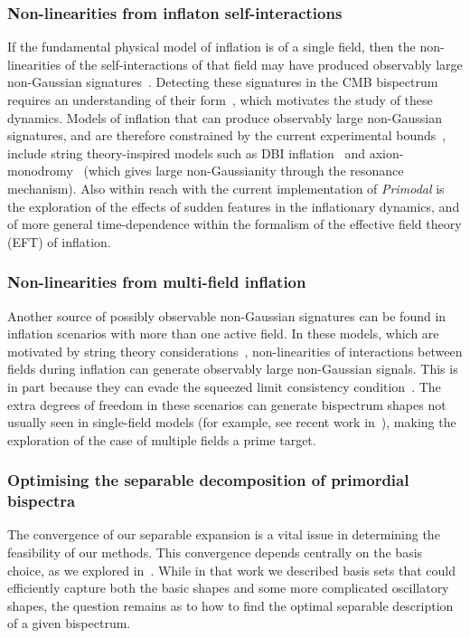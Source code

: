 \subsubsection{Non-linearities from inflaton self-interactions}
If the fundamental physical model of inflation is of a single field,
then the non-linearities of the self-interactions of that field may have
produced observably large non-Gaussian signatures~\cite{Tolley_2010, achucarro_eft}.
Detecting these signatures in the CMB bispectrum requires an understanding
of their form~\cite{Komatsu_2005}, which motivates the study of these dynamics.
Models of inflation that can produce observably large non-Gaussian signatures,
and are therefore constrained by the current experimental bounds~\cite{Planck_NG_2018},
include string theory-inspired models such as DBI inflation~\cite{dbi_silverstein}
and axion-monodromy~\cite{axion_monodr_review_09, Flauger_2014}
(which gives large non-Gaussianity through the resonance mechanism).
Also within reach with the current implementation of \textit{Primodal}
is the exploration of the effects of sudden
features in the inflationary dynamics, and of more general
time-dependence within the formalism of the effective field theory (EFT) of inflation. 

\subsubsection{Non-linearities from multi-field inflation}
Another source of possibly observable non-Gaussian signatures can be
found in inflation scenarios with more than one active field.
In these models, which are motivated by string theory considerations~\cite{achucarro_multifield1},
non-linearities of interactions between fields during inflation
can generate observably large non-Gaussian signals.
This is in part because they can evade the squeezed limit consistency condition~\cite{sqz_consistency}.
The extra degrees of freedom in these scenarios can generate bispectrum shapes not usually
seen in single-field models (for example, see recent work in~\cite{RP_2, Fumagalli_2019}),
making the exploration of the case of multiple fields a prime target.

\subsubsection{Optimising the separable decomposition of primordial bispectra}
The convergence of our separable expansion is a vital issue in determining the feasibility of our methods.
This convergence depends centrally on the basis choice, as we explored in~\cite{probing_precision}.
While in that work we described basis sets that could efficiently capture both the
basic shapes and some more complicated oscillatory shapes,
the question remains as to how to find the optimal separable description of a given bispectrum.

